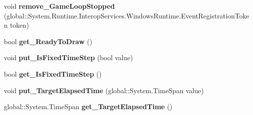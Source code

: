 \begin{DoxyCompactItemize}
\item 
\mbox{\label{class_microsoft_1_1_graphics_1_1_canvas_1_1_u_i_1_1_xaml_1_1_canvas_animated_control_a6e4ad589f4e74a8f247acdee86b8fb7b}} 
void {\bfseries remove\+\_\+\+Game\+Loop\+Stopped} (global\+::\+System.\+Runtime.\+Interop\+Services.\+Windows\+Runtime.\+Event\+Registration\+Token token)
\item 
\mbox{\label{class_microsoft_1_1_graphics_1_1_canvas_1_1_u_i_1_1_xaml_1_1_canvas_animated_control_a7e2eaf078ebdb9e09f670e36cda378a6}} 
bool {\bfseries get\+\_\+\+Ready\+To\+Draw} ()
\item 
\mbox{\label{class_microsoft_1_1_graphics_1_1_canvas_1_1_u_i_1_1_xaml_1_1_canvas_animated_control_a9557ee88a094ee48079b9752be811d33}} 
void {\bfseries put\+\_\+\+Is\+Fixed\+Time\+Step} (bool value)
\item 
\mbox{\label{class_microsoft_1_1_graphics_1_1_canvas_1_1_u_i_1_1_xaml_1_1_canvas_animated_control_aab52731c791474a541ee203482c3f3f7}} 
bool {\bfseries get\+\_\+\+Is\+Fixed\+Time\+Step} ()
\item 
\mbox{\label{class_microsoft_1_1_graphics_1_1_canvas_1_1_u_i_1_1_xaml_1_1_canvas_animated_control_a9246ed7514c3335aedd3104906589f3c}} 
void {\bfseries put\+\_\+\+Target\+Elapsed\+Time} (global\+::\+System.\+Time\+Span value)
\item 
\mbox{\label{class_microsoft_1_1_graphics_1_1_canvas_1_1_u_i_1_1_xaml_1_1_canvas_animated_control_a0601d1aa0b36681997fec8d67ba0dba2}} 
global\+::\+System.\+Time\+Span {\bfseries get\+\_\+\+Target\+Elapsed\+Time} ()
\item 
\mbox{\label{class_microsoft_1_1_graphics_1_1_canvas_1_1_u_i_1_1_xaml_1_1_canvas_animated_control_ab551f3cf783df37fac0935e7042d4086}} 

\end{DoxyCompactItemize}
